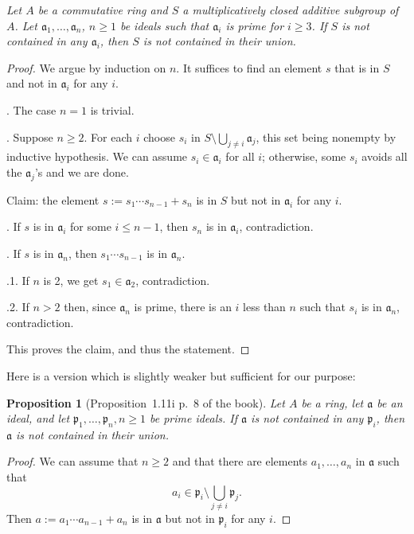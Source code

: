\documentclass[12pt,letterpaper]{article}%
\newcommand{\mf}{\mathfrak}
\newcommand{\aaa}{\mf a}
\newcommand{\ppp}{\mf p}
\newcommand{\nn}{\noindent}
\newtheorem{prop}[thm]{Proposition}
\begin{document}
\nn\emph{Let $A$ be a commutative ring and $S$ a multiplicatively closed additive subgroup of $A$. Let $\aaa_1,\dots,\aaa_n$, $n\ge1$ be ideals such that $\aaa_i$ is prime for $i\ge3$. If $S$ is not contained in any $\aaa_i$, then $S$ is not contained in their union.}

\begin{proof} 
We argue by induction on $n$. It suffices to find an element $s$ that is in $S$ and not in $\aaa_i$ for any $i$. 

\nn1. The case $n=1$ is trivial. 

\nn2. Suppose $n\ge2$. For each $i$ choose $s_i$ in $S\setminus\bigcup_{j \ne i}\aaa_j$, this set being nonempty by inductive hypothesis. We can assume $s_i \in \aaa_i$ for all $i$; otherwise, some $s_i$ avoids all the $\aaa_j$'s and we are done. 

\nn Claim: the element $s:=s_1\cdots s_{n-1}+s_n$ is in $S$ but not in $\aaa_i$ for any $i$. 

\nn2.1. If $s$ is in $\aaa_i$ for some $i\le n-1$, then $s_n$ is in $\aaa_i$, contradiction. 

\nn2.2. If $s$ is in $\aaa_n$, then $s_1\cdots s_{n-1}$ is in $\aaa_n$. 

\nn2.2.1. If $n$ is 2, we get $s_1\in \aaa_2$, contradiction.

\nn2.2.2. If $n>2$ then, since $\aaa_n$ is prime, there is an $i$ less than $n$ such that $s_i$ is in $\aaa_n$, contradiction.

\nn This proves the claim, and thus the statement. 
\end{proof}

Here is a version which is slightly weaker but sufficient for our purpose:

\begin{prop}[Proposition~1.11i p.~8 of the book]\label{p1.11i}
Let $A$ be a ring, let $\aaa$ be an ideal, and let $\ppp_1,\dots,\ppp_n,n\ge1$ be prime ideals. If $\aaa$ is not contained in any $\ppp_i$, then $\aaa$ is not contained in their union.
\end{prop}
\begin{proof} 
We can assume that $n\ge2$ and that there are elements $a_1,\dots,a_n$ in $\aaa$ such that 
$$
a_i\in\ppp_i\setminus\bigcup_{j\ne i}\ppp_j.
$$ 
Then $a:=a_1\cdots a_{n-1}+a_n$ is in $\aaa$ but not in $\ppp_i$ for any $i$.
\end{proof}

\end{document}
